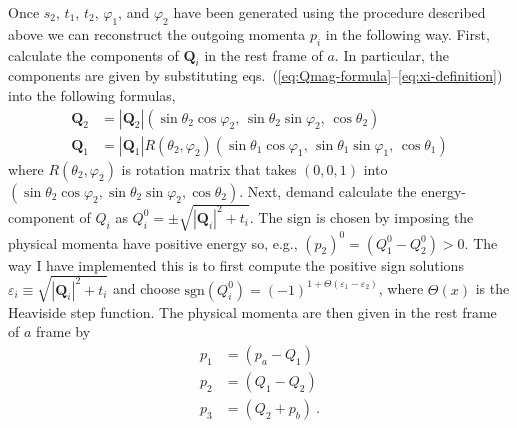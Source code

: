 Once $s_2$, $t_1$, $t_2$, $\varphi_1$, and $\varphi_2$ have been generated using the procedure described above we can reconstruct the outgoing momenta $p_i$ in the following way.
First, calculate the components of $\bm{Q}_i$ in the rest frame of $a$. 
In particular, the components are given by substituting eqs.~(\ref{eq:Qmag-formula}--\ref{eq:xi-definition}) into the following formulas,
\begin{align}
    \bm{Q}_2 &= 
    |\bm{Q}_2|
    ( \sin \theta_2 \cos \varphi_2, \,  
      \sin \theta_2 \sin \varphi_2, \,
      \cos \theta_2) \\
    \bm{Q}_1 &= 
    |\bm{Q}_1| R(\theta_2, \varphi_2)
    ( \sin \theta_1 \cos \varphi_1, \,
      \sin \theta_1 \sin \varphi_1, \,
      \cos \theta_1) 
\end{align}
where $R(\theta_2, \varphi_2)$ is rotation matrix that takes $(0, 0, 1)$ into $(\sin \theta_2 \cos \varphi_2, \sin \theta_2 \sin\varphi_2, \cos \theta_2)$. 
Next, demand calculate the energy-component of $Q_i$ as $Q_i^0 = \pm \sqrt{|\bm{Q}_i|^2 + t_i}$. 
The sign is chosen by imposing the physical momenta have positive energy so, e.g., $(p_2)^0 = (Q_1^0 - Q_2^0) > 0$. 
The way I have implemented this is to first compute the positive sign solutions $\varepsilon_i \equiv \sqrt{|\bm{Q}_i|^2 + t_i}$ and choose $\mathrm{sgn}(Q_i^0) = (-1)^{1 + \Theta(\varepsilon_1 - \varepsilon_2)}$, where $\Theta(x)$ is the Heaviside step function.
The physical momenta are then given in the rest frame of $a$ frame by
\begin{align}
    p_1 &= (p_a - Q_1) \\
    p_2 &= (Q_1 - Q_2) \\
    p_3 &= (Q_2 + p_b) \ .
\end{align}





